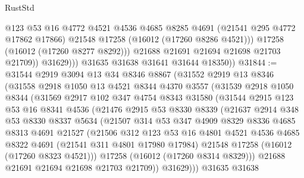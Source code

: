 \begin{lexlean}{RustStd}
\begin{coremodule}
                      @123
                      @53
                      @16
                      @4772
                      @4521
                      @4536
                      @4685
                      @8285
                      @4691
                      (@21541 @295 @4772 @17862 @17866)
                      @21548
                      @17258
                      (@16012 (@17260 @8286 @4521)))
                    @17258
                    (@16012 (@17260 @8277 @8292)))
                  @21688
                  @21691
                  @21694
                  @21698
                  @21703
                  @21709))
              @31629)))
        @31635
        @31638
        @31641
        @31644
        @18350))
@31844 := @31544
    @2919
    @3094
    @13
    @34
    @8346
    @8867
    (@31552
      @2919
      @13
      @8346
      (@31558
        @2918
        @1050
        @13
        @4521
        @8344
        @4370
        @3557
        (@31539
          @2918
          @1050
          @8344
          (@31569
            @2917
            @102
            @347
            @4754
            @8343
            @31580
            (@31544
              @2915
              @123
              @53
              @16
              @8341
              @4536
              (@21476
                @2915
                @53
                @8330
                @8339
                (@21637
                  @2914
                  @348
                  @53
                  @8330
                  @8337
                  @5634
                  (@21507
                    @314
                    @53
                    @347
                    @4909
                    @8329
                    @8336
                    @4685
                    @8313
                    @4691
                    @21527
                    (@21506
                      @312
                      @123
                      @53
                      @16
                      @4801
                      @4521
                      @4536
                      @4685
                      @8322
                      @4691
                      (@21541 @311 @4801 @17980 @17984)
                      @21548
                      @17258
                      (@16012 (@17260 @8323 @4521)))
                    @17258
                    (@16012 (@17260 @8314 @8329)))
                  @21688
                  @21691
                  @21694
                  @21698
                  @21703
                  @21709))
              @31629)))
        @31635
        @31638

\end{coremodule}
\end{lexlean}
